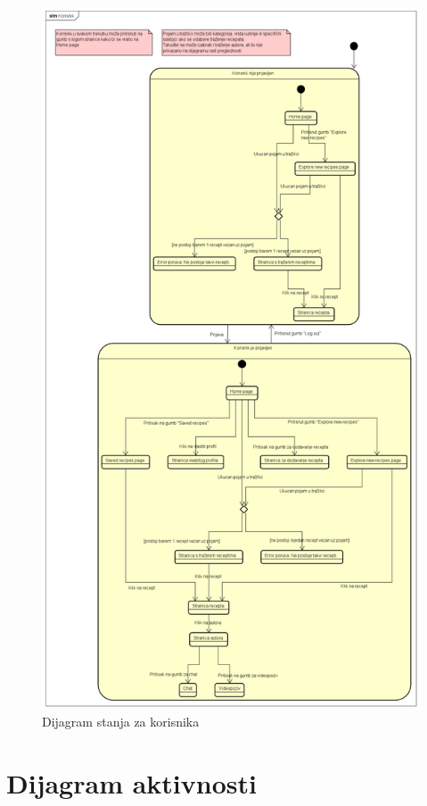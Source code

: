 			\begin{figure}[H]
				\centering
				\includegraphics[height=0.95\textheight]{slike/dijagrami/Korisnik_dijagram_stanja.png}
				\caption{Dijagram stanja za korisnika}
				\label{fig:enter-label}
			\end{figure}
			
			
			\eject 
		
		\section{Dijagram aktivnosti}
			
